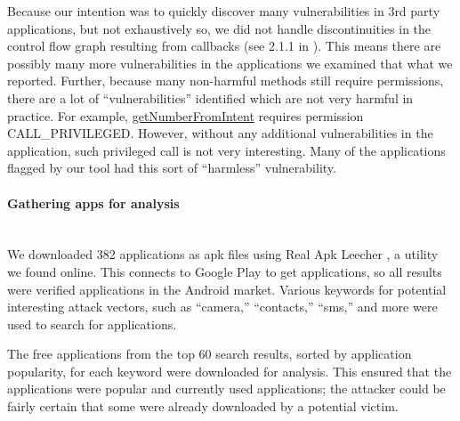 \documentclass[12pt,a4paper]{article}
\begin{document}
Because our intention was to quickly discover many vulnerabilities in 3rd party
applications, but not exhaustively so, we did not handle discontinuities in the
control flow graph resulting from callbacks (see 2.1.1 in
\cite{grace_systematic_2012}). This means there are possibly many more
vulnerabilities in the applications we examined that what we reported. Further,
because many non-harmful methods still require permissions, there are a lot of
``vulnerabilities'' identified which are not very harmful in practice.  For
example,
\href{https://developer.android.com/reference/android/telephony/PhoneNumberUtils.html#getNumberFromIntent\%28android.content.Intent,\%20android.content.Context\%29}{getNumberFromIntent}
requires permission CALL\_PRIVILEGED. However, without any additional
vulnerabilities in the application, such privileged call is not very
interesting. Many of the applications flagged by our tool had this sort of
``harmless'' vulnerability.

\paragraph{Gathering apps for analysis} ~\\
We downloaded 382 applications as apk files using Real Apk Leecher
\cite{apkleecher}, a utility we found online. This connects to Google Play to
get applications, so all results were verified applications in the Android
market. Various keywords for potential interesting attack vectors, such as
``camera,'' ``contacts,'' ``sms,'' and more were used to search for
applications. 

The free applications from the top 60 search results, sorted by application
popularity, for each keyword were downloaded for analysis.  This ensured that
the applications were popular and currently used applications; the attacker
could be fairly certain that some were already downloaded by a potential victim.
\end{document}
